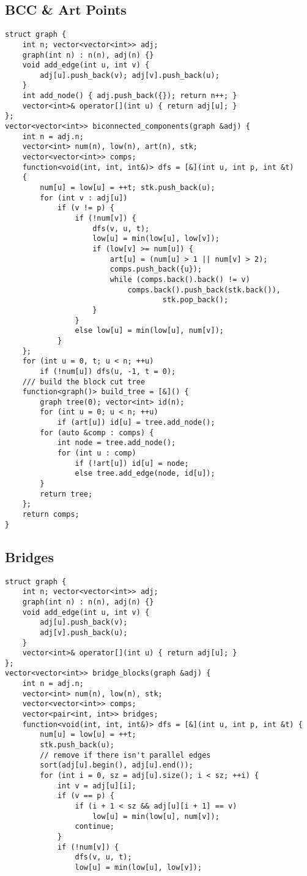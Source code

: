 \documentclass[landscape, 8pt, a4paper, oneside]{extarticle}
\begin{document}
\begin{multicols}{3}
\subsection{BCC & Art Points}
\begin{verbatim}
struct graph {
    int n; vector<vector<int>> adj;
    graph(int n) : n(n), adj(n) {}
    void add_edge(int u, int v) {
        adj[u].push_back(v); adj[v].push_back(u);
    }
    int add_node() { adj.push_back({}); return n++; }
    vector<int>& operator[](int u) { return adj[u]; }
};
vector<vector<int>> biconnected_components(graph &adj) {
    int n = adj.n;
    vector<int> num(n), low(n), art(n), stk;
    vector<vector<int>> comps;
    function<void(int, int, int&)> dfs = [&](int u, int p, int &t)
    {
        num[u] = low[u] = ++t; stk.push_back(u);
        for (int v : adj[u])
            if (v != p) {
                if (!num[v]) {
                    dfs(v, u, t);
                    low[u] = min(low[u], low[v]);
                    if (low[v] >= num[u]) {
                        art[u] = (num[u] > 1 || num[v] > 2);
                        comps.push_back({u});
                        while (comps.back().back() != v)
                            comps.back().push_back(stk.back()),
                                    stk.pop_back();
                    }
                }
                else low[u] = min(low[u], num[v]);
            }
    };
    for (int u = 0, t; u < n; ++u)
        if (!num[u]) dfs(u, -1, t = 0);
    /// build the block cut tree
    function<graph()> build_tree = [&]() {
        graph tree(0); vector<int> id(n);
        for (int u = 0; u < n; ++u)
            if (art[u]) id[u] = tree.add_node();
        for (auto &comp : comps) {
            int node = tree.add_node();
            for (int u : comp)
                if (!art[u]) id[u] = node;
                else tree.add_edge(node, id[u]);
        }
        return tree;
    };
    return comps;
}
\end{verbatim}
\subsection{Bridges}
\begin{verbatim}
struct graph {
    int n; vector<vector<int>> adj;
    graph(int n) : n(n), adj(n) {}
    void add_edge(int u, int v) {
        adj[u].push_back(v);
        adj[v].push_back(u);
    }
    vector<int>& operator[](int u) { return adj[u]; }
};
vector<vector<int>> bridge_blocks(graph &adj) {
    int n = adj.n;
    vector<int> num(n), low(n), stk;
    vector<vector<int>> comps;
    vector<pair<int, int>> bridges;
    function<void(int, int, int&)> dfs = [&](int u, int p, int &t) {
        num[u] = low[u] = ++t;
        stk.push_back(u);
        // remove if there isn't parallel edges
        sort(adj[u].begin(), adj[u].end());
        for (int i = 0, sz = adj[u].size(); i < sz; ++i) {
            int v = adj[u][i];
            if (v == p) {
                if (i + 1 < sz && adj[u][i + 1] == v)
                    low[u] = min(low[u], num[v]);
                continue;
            }
            if (!num[v]) {
                dfs(v, u, t);
                low[u] = min(low[u], low[v]);


\end{verbatim}
\end{multicols}
\end{document}
